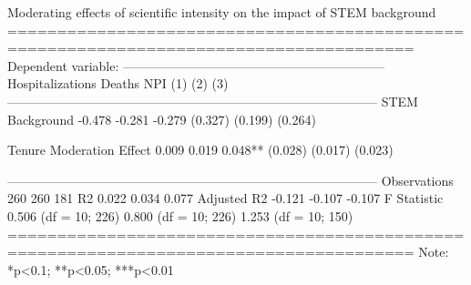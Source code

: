 
Moderating effects of scientific intensity on the impact of STEM background
=======================================================================================
                                              Dependent variable:                      
                         --------------------------------------------------------------
                           Hospitalizations          Deaths                NPI         
                                 (1)                  (2)                  (3)         
---------------------------------------------------------------------------------------
STEM Background                 -0.478               -0.281               -0.279       
                               (0.327)              (0.199)              (0.264)       
                                                                                       
Tenure Moderation Effect        0.009                0.019               0.048**       
                               (0.028)              (0.017)              (0.023)       
                                                                                       
---------------------------------------------------------------------------------------
Observations                     260                  260                  181         
R2                              0.022                0.034                0.077        
Adjusted R2                     -0.121               -0.107               -0.107       
F Statistic              0.506 (df = 10; 226) 0.800 (df = 10; 226) 1.253 (df = 10; 150)
=======================================================================================
Note:                                                       *p<0.1; **p<0.05; ***p<0.01
